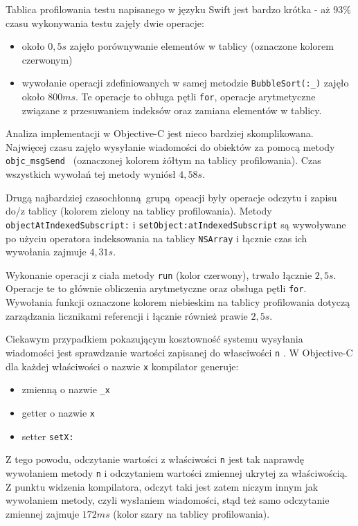\documentclass[mgr, shortabstract]{iithesis}
\newcommand{\swiftinline}[1]{
    \texttt{#1}
}
\newcommand{\objcinline}[1]{
    \texttt{#1}
}
\begin{document}
Tablica profilowania testu napisanego w języku Swift jest bardzo krótka - aż 93\% czasu wykonywania testu zajęły dwie operacje:

\begin{itemize}
    \item około $0,5s$ zajęło porównywanie elementów w tablicy (oznaczone kolorem czerwonym)
    \item wywołanie operacji zdefiniowanych w samej metodzie \swiftinline{BubbleSort(:_)} zajęło około $800 ms$. Te operacje to obługa pętli \texttt{for}, operacje arytmetyczne związane z przesuwaniem indeksów oraz zamiana elementów w tablicy.
\end{itemize}

Analiza implementacji w Objective-C jest nieco bardziej skomplikowana. Najwięcej czasu zajęło wysyłanie wiadomości do obiektów za pomocą metody \objcinline{objc_msgSend } (oznaczonej kolorem żółtym na tablicy profilowania). Czas wszystkich wywołań tej metody wyniósł $4,58s$.

Drugą najbardziej czasochłonną grupą opeacji były operacje odczytu i zapisu do/z tablicy (kolorem zielony na tablicy profilowania). Metody \objcinline{objectAtIndexedSubscript:} i \objcinline{setObject:atIndexedSubscript} są wywoływane po użyciu operatora indeksowania na tablicy \objcinline{NSArray} i łącznie czas ich wywołania zajmuje $4,31s$.

Wykonanie operacji z ciała metody \objcinline{run} (kolor czerwony), trwało łącznie $2,5s$. Operacje te to głównie obliczenia arytmetyczne oraz obsługa pętli \texttt{for}. Wywołania funkcji oznaczone kolorem niebieskim na tablicy profilowania dotyczą zarządzania licznikami referencji i łącznie również prawie $2,5s$.

Ciekawym przypadkiem pokazującym kosztowność systemu wysyłania wiadomości jest sprawdzanie wartości zapisanej do własciwości \objcinline{n}. W Objective-C dla każdej właściwości o nazwie \objcinline{x} kompilator generuje:

\begin{itemize}
    \item zmienną o nazwie \objcinline{_x}
    \item getter o nazwie \objcinline{x}
    \item setter \objcinline{setX:}
\end{itemize}

Z tego powodu, odczytanie wartości z właściwości  \objcinline{n} jest tak naprawdę wywołaniem metody \objcinline{n} i odczytaniem wartości zmiennej ukrytej za właściwością. Z punktu widzenia kompilatora, odczyt taki jest zatem niczym innym jak wywołaniem metody, czyli wysłaniem wiadomości, stąd też samo odczytanie zmiennej zajmuje $172ms$ (kolor szary na tablicy profilowania).
\end{document}
